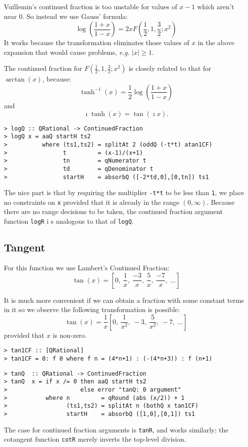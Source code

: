 Vuillemin's continued fraction is too unstable for values of $x-1$
which aren't near $0$. So instead we use Gauss' formula:
\[\log(\frac{1+x}{1-x}) = 2xF(\frac{1}{2},1,\frac{3}{2}; x^2)\]
It works because the transformation eliminates those values of $x$
in the above expansion that would cause problems, {\it e.g.} $|x|
\geq 1$.

The continued fraction for $F(\frac{1}{2},1,\frac{3}{2}; x^2)$ is
closely related to that for $\arctan(x)$, because:
\[\tanh^{-1}(x) = \frac{1}{2} \log(\frac{1+x}{1-x})\]
and
\[\imath \tanh(x) = \tan(\imath x).\]
\begin{verbatim}
> logQ :: QRational -> ContinuedFraction
> logQ x = aaQ startH ts2
>          where (ts1,ts2) = splitAt 2 (oddQ (-t*t) atan1CF)
>                t         = (x-1)/(x+1)
>                tn        = qNumerator t
>                td        = qDenominator t
>                startH    = absorbQ ([-2*td,0],[0,tn]) ts1
\end{verbatim}
%
%
The nice part is that by requiring the multiplier \mbox{\tt -t*t} to be less
than \mbox{\tt 1}, we place no constraints on \mbox{\tt x} provided that it is 
already
in the range $(0,\infty )$. Because there are no range decisions to be
taken, the continued fraction argument function \mbox{\tt logR} i
s analogous to
that of \mbox{\tt logQ}.

\subsection{Tangent}

For this function we use Lambert's Continued Fraction:
\[\tan(x) = [0,~\frac{1}{x},~\frac{-3}{x},~\frac{5}{x},~\frac{-7}{x},~\ldots]\]

It is much more convenient if we can obtain a fraction with some
constant terms in it so we observe the following transformation is
possible:
\[\tan(x) = \frac{1}{x}[0,~\frac{1}{x^2},~-3,~\frac{5}{x^2},~-7,~\ldots]\]
provided that $x$ is non-zero.
\begin{verbatim}
> tan1CF :: [QRational]
> tan1CF = 0: f 0 where f n = (4*n+1) : (-(4*n+3)) : f (n+1)
\end{verbatim}
%
%
\begin{verbatim}
> tanQ  :: QRational -> ContinuedFraction
> tanQ  x = if x /= 0 then aaQ startH ts2
>                     else error "tanQ: 0 argument"
>           where n         = qRound (abs (x/2)) + 1
>                 (ts1,ts2) = splitAt n (bothQ x tan1CF)
>                 startH    = absorbQ ([1,0],[0,1]) ts1
\end{verbatim}
%
%
The case for continued fraction arguments is \mbox{\tt tanR}, and
 works
similarly; the cotangent function \mbox{\tt cotR} merely inverts 
the top-level
division.

